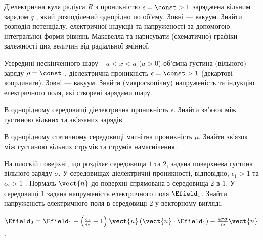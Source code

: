 \begin{problem}%
Діелектрична куля радіуса $R$  з проникністю  $\epsilon =\const > 1$ заряджена вільним зарядом $q$ , який розподілений однорідно по об’єму. Зовні ---
вакуум. Знайти розподіл потенціалу, електричної індукції та напруженості за допомогою інтегральної форми рівнянь Максвелла та нарисувати (схематично)
графіки залежності цих величин від радіальної змінної.
\end{problem}


\begin{problem}%
Усередині нескінченного шару  $-a < x < a$  ($a> 0 $) об’ємна густина (вільного) заряду $\rho =
\const$ , діелектрична проникність $\epsilon =\const >
1$   (декартові координати). Зовні --- вакуум. Знайти (макроскопічну) напруженість та індукцію електричного поля, які створені зарядами шару.
\end{problem}


\begin{problem}%
В однорідному середовищі діелектрична проникність  $\epsilon$. Знайти зв’язок між густиною вільних та зв’язаних зарядів.
\end{problem}

\begin{problem}%
В однорідному статичному середовищі магнітна проникність $\mu$. Знайти зв’язок між густиною вільних струмів та струмів намагнічення.
\end{problem}



\begin{problem}
    На плоскій поверхні, що розділяє середовища $1$ та $2$, задана поверхнева густина вільного заряду $\sigma$. У середовищах діелектричні проникності, відповідно, $\epsilon_1 > 1$ та $\epsilon_2 > 1$ . Нормаль $\vect{n}$ до поверхні спрямована з середовища $2$ в $1$. У середовищі $1$ задана напруженість електричного поля $\Efield_1$. Знайти напруженість електричного поля в середовищі $2$ у векторному вигляді.
\begin{solution}
    $\Efield_2 = \Efield_1 + \left( \frac{\epsilon_1}{\epsilon _2} - 1 \right)\vect{n}\left( \vect{n} \cdot \Efield_1 \right) - \frac{4\pi \sigma }{\epsilon _2}{\vect{n}}$.
\end{solution}
\end{problem}

